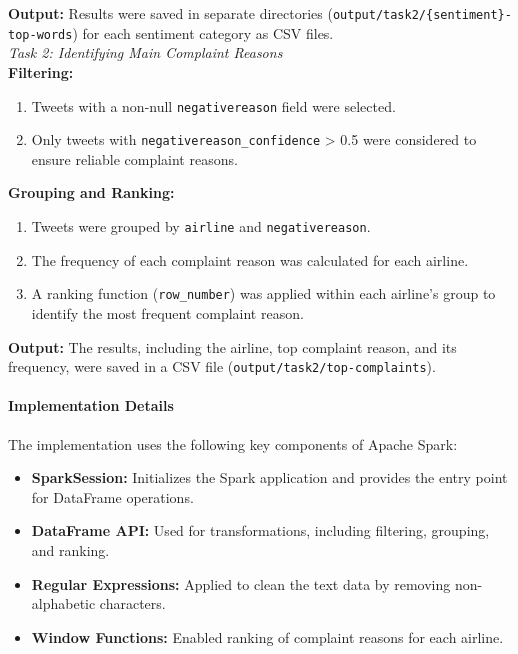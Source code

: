 \documentclass[acmlarge]{acmart}
\begin{document}
  \textbf{Output:}
  Results were saved in separate directories (\texttt{output/task2/\{sentiment\}-top-words}) for each sentiment category as CSV files.
  \\

  \textit{Task 2: Identifying Main Complaint Reasons}
  \\

  \textbf{Filtering:}
  \begin{enumerate}
    \item Tweets with a non-null \texttt{negativereason} field were selected.
    \item Only tweets with \texttt{negativereason\_confidence} > 0.5 were considered to ensure reliable complaint reasons.
  \end{enumerate}

  \textbf{Grouping and Ranking:}
  \begin{enumerate}
    \item Tweets were grouped by \texttt{airline} and \texttt{negativereason}.
    \item The frequency of each complaint reason was calculated for each airline.
    \item A ranking function (\texttt{row\_number}) was applied within each airline's group to identify the most frequent complaint reason.
  \end{enumerate}

  \textbf{Output:}
  The results, including the airline, top complaint reason, and its frequency, were saved in a CSV file (\texttt{output/task2/top-complaints}).

  \paragraph{Implementation Details}
  The implementation uses the following key components of Apache Spark:
  \begin{itemize}
    \item \textbf{SparkSession:} Initializes the Spark application and provides the entry point for DataFrame operations.
    \item \textbf{DataFrame API:} Used for transformations, including filtering, grouping, and ranking.
    \item \textbf{Regular Expressions:} Applied to clean the text data by removing non-alphabetic characters.
    \item \textbf{Window Functions:} Enabled ranking of complaint reasons for each airline.
  \end{itemize}
\end{document}
